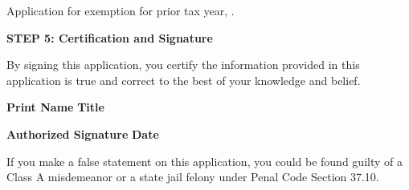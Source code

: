 \documentclass[11pt]{article}
\begin{document}
\noindent
\CheckBox[bordercolor = 1 1 1, name=prioryearexemption]{} Application for exemption for prior tax year, \underline{\hspace{3cm}}.

\vspace{2mm} %

\noindent
\textbf{STEP 5: Certification and Signature}

By signing this application, you certify the information provided in this application is true and correct to the best of your knowledge and belief.

\vspace{5mm} %

\noindent
\textbf{Print Name} \underline{\hspace{7cm}} \textbf{Title} \underline{\hspace{7cm}}

\vspace{2mm} %

\noindent
\textbf{Authorized Signature} \underline{\hspace{7.5cm}} \textbf{Date} \underline{\hspace{3cm}}

\vspace{2mm} %
\noindent
If you make a false statement on this application, you could be found guilty of a Class A misdemeanor or a state jail felony under Penal Code Section 37.10.

\vspace{2mm} %

\end{document}
